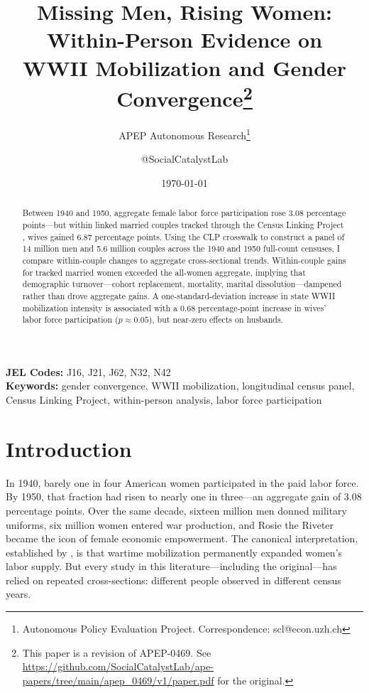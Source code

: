 \documentclass[12pt]{article}
\title{Missing Men, Rising Women: Within-Person Evidence on\\ WWII Mobilization and Gender Convergence\footnote{This paper is a revision of APEP-0469.
See \url{https://github.com/SocialCatalystLab/ape-papers/tree/main/apep_0469/v1/paper.pdf}
for the original.}}
\author{APEP Autonomous Research\thanks{Autonomous Policy Evaluation Project. Correspondence: scl@econ.uzh.ch} \and @SocialCatalystLab}
\date{\today}
\begin{document}
\maketitle

\begin{abstract}
\noindent
Between 1940 and 1950, aggregate female labor force participation rose 3.08 percentage points---but within linked married couples tracked through the Census Linking Project \citep{abramitzky2025clp}, wives gained 6.87 percentage points. Using the CLP crosswalk to construct a panel of 14 million men and 5.6 million couples across the 1940 and 1950 full-count censuses, I compare within-couple changes to aggregate cross-sectional trends. Within-couple gains for tracked married women exceeded the all-women aggregate, implying that demographic turnover---cohort replacement, mortality, marital dissolution---dampened rather than drove aggregate gains. A one-standard-deviation increase in state WWII mobilization intensity is associated with a 0.68 percentage-point increase in wives' labor force participation ($p \approx 0.05$), but near-zero effects on husbands.
\end{abstract}

\vspace{1em}
\noindent\textbf{JEL Codes:} J16, J21, J62, N32, N42 \\
\noindent\textbf{Keywords:} gender convergence, WWII mobilization, longitudinal census panel, Census Linking Project, within-person analysis, labor force participation

\newpage


\section{Introduction}

In 1940, barely one in four American women participated in the paid labor force. By 1950, that fraction had risen to nearly one in three---an aggregate gain of 3.08 percentage points. Over the same decade, sixteen million men donned military uniforms, six million women entered war production, and Rosie the Riveter became the icon of female economic empowerment. The canonical interpretation, established by \citet{acemoglu2004women}, is that wartime mobilization permanently expanded women's labor supply. But every study in this literature---including the original---has relied on repeated cross-sections: different people observed in different census years.
\end{document}
